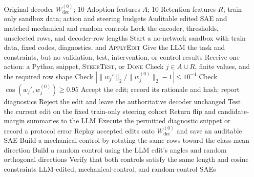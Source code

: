 \begin{algorithm}[H]
\caption{Constrained LLM-guided SAE decoder editing}
\label{alg:llm-guided-sae-editing}
\begin{algorithmic}[1]
\Require Original decoder $W_{\mathrm{dec}}^{(0)}$; 10 Adoption features $A$;
10 Retention features $R$; train-only sandbox data; action and steering budgets
\Ensure Auditable edited SAE and matched mechanical and random controls
\State Lock the encoder, thresholds, unselected rows, and decoder-row lengths
\State Start a no-network sandbox with train data, fixed codes, diagnostics, and \textsc{ApplyEdit}
\State Give the LLM the task and constraints, but no validation, test, intervention, or control results
    \State Receive one action: a Python snippet, \textsc{SteerTest}, or \textsc{Done}
        \State Check $j\in A\cup R$, finite values, and the required row shape
        \State Check $|\lVert w_j'\rVert_2/\lVert w_j^{(0)}\rVert_2-1|\le10^{-4}$
        \State Check $\cos(w_j',w_j^{(0)})\ge0.95$
            \State Accept the edit; record its rationale and hash; report diagnostics
        \Else
            \State Reject the edit and leave the authoritative decoder unchanged
        \EndIf
        \State Test the current edit on the fixed train-only steering cohort
        \State Return flip and candidate-margin summaries to the LLM
    \Else
        \State Execute the permitted diagnostic snippet or record a protocol error
    \EndIf
\EndWhile
\State Replay accepted edits onto $W_{\mathrm{dec}}^{(0)}$ and save an auditable SAE
\State Build a mechanical control by rotating the same rows toward the class-mean direction
\State Build a random control using the LLM edit's angles and random orthogonal directions
\State Verify that both controls satisfy the same length and cosine constraints
\State \Return LLM-edited, mechanical-control, and random-control SAEs
\end{algorithmic}
\end{algorithm}
